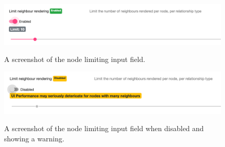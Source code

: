 \begin{figure}[h!]
  \centering
  \includegraphics[width = 15cm]{./figures/ui-screenshots/limit-nodes-filter}\\[0.5cm] 
  \caption{A screenshot of the node limiting input field.}
  \label{fig:limit-node-filter}
\end{figure}

\begin{figure}[h!]
  \centering
  \includegraphics[width = 15cm]{./figures/ui-screenshots/limit-nodes-filter-warning}\\[0.5cm] 
  \caption{A screenshot of the node limiting input field when disabled and showing a warning.}
  \label{fig:limit-node-filter-warning}
\end{figure}

